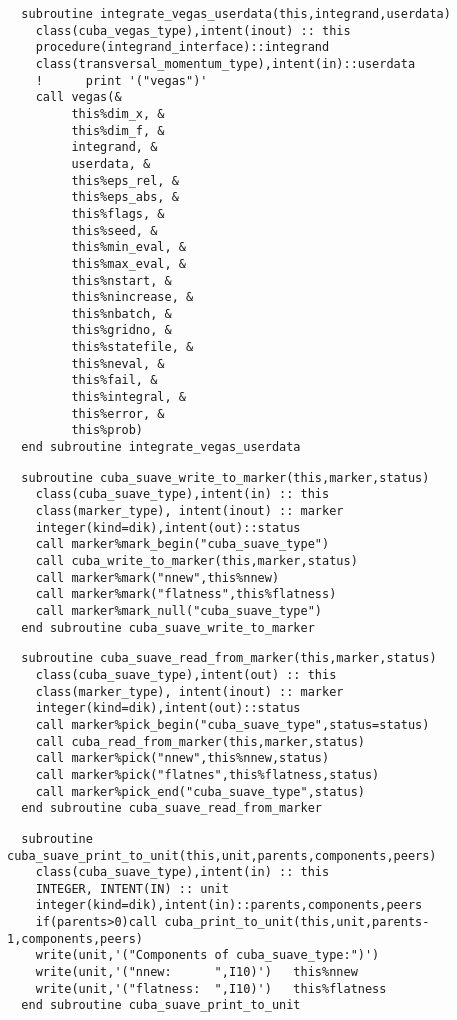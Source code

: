 \begin{Verbatim}
  subroutine integrate_vegas_userdata(this,integrand,userdata)
    class(cuba_vegas_type),intent(inout) :: this
    procedure(integrand_interface)::integrand
    class(transversal_momentum_type),intent(in)::userdata
    !      print '("vegas")'
    call vegas(&
         this%dim_x, &
         this%dim_f, &
         integrand, &
         userdata, &
         this%eps_rel, &
         this%eps_abs, &
         this%flags, &
         this%seed, &
         this%min_eval, &
         this%max_eval, &
         this%nstart, &
         this%nincrease, &
         this%nbatch, &
         this%gridno, &
         this%statefile, &
         this%neval, &
         this%fail, &
         this%integral, &
         this%error, &
         this%prob)
  end subroutine integrate_vegas_userdata
\end{Verbatim}
\begin{Verbatim}
  subroutine cuba_suave_write_to_marker(this,marker,status)
    class(cuba_suave_type),intent(in) :: this
    class(marker_type), intent(inout) :: marker
    integer(kind=dik),intent(out)::status
    call marker%mark_begin("cuba_suave_type")
    call cuba_write_to_marker(this,marker,status)
    call marker%mark("nnew",this%nnew)
    call marker%mark("flatness",this%flatness)
    call marker%mark_null("cuba_suave_type")
  end subroutine cuba_suave_write_to_marker
\end{Verbatim}

\begin{Verbatim}
  subroutine cuba_suave_read_from_marker(this,marker,status)
    class(cuba_suave_type),intent(out) :: this
    class(marker_type), intent(inout) :: marker
    integer(kind=dik),intent(out)::status
    call marker%pick_begin("cuba_suave_type",status=status)
    call cuba_read_from_marker(this,marker,status)
    call marker%pick("nnew",this%nnew,status)
    call marker%pick("flatnes",this%flatness,status)
    call marker%pick_end("cuba_suave_type",status)
  end subroutine cuba_suave_read_from_marker
\end{Verbatim}

\begin{Verbatim}
  subroutine cuba_suave_print_to_unit(this,unit,parents,components,peers)
    class(cuba_suave_type),intent(in) :: this
    INTEGER, INTENT(IN) :: unit
    integer(kind=dik),intent(in)::parents,components,peers
    if(parents>0)call cuba_print_to_unit(this,unit,parents-1,components,peers)
    write(unit,'("Components of cuba_suave_type:")')
    write(unit,'("nnew:      ",I10)')   this%nnew
    write(unit,'("flatness:  ",I10)')   this%flatness
  end subroutine cuba_suave_print_to_unit
\end{Verbatim}

